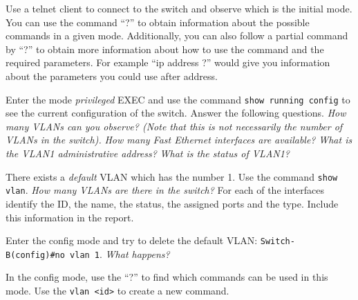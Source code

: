 Use a telnet client to connect to the switch and observe which is the initial mode.
You can use the command ``?'' to obtain information about the possible commands in a given mode.
Additionally, you can also follow a partial command by ``?'' to obtain more information about how to use the command and the required parameters.
For example ``ip address ?'' would give you information about the parameters you could use after address.

Enter the mode \emph{privileged} EXEC and use the command \texttt{show running config} to see the current configuration of the switch.
Answer the following questions.
\emph{How many VLANs can you observe? (Note that this is not necessarily the number of VLANs in the switch).}
\emph{How many Fast Ethernet interfaces are available?}
\emph{What is the VLAN1 administrative address?}
\emph{What is the status of VLAN1?}

There exists a \emph{default} VLAN which has the number 1.
Use the command \texttt{show vlan}.
\emph{How many VLANs are there in the switch?}
For each of the interfaces identify the ID, the name, the status, the assigned ports and the type.
Include this information in the report.

Enter the config mode and try to delete the default VLAN: 
\texttt{Switch-B(config)#no vlan 1}.
\emph{What happens?}

In the config mode, use the ``?'' to find which commands can be used in this mode.
Use the \texttt{vlan <id>} to create a new command.














